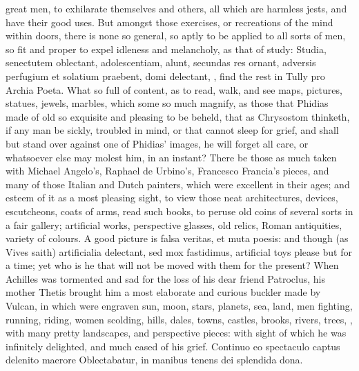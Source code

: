 {great men, to exhilarate themselves and others, all which are harmless
jests, and have their good uses.
But amongst those exercises, or recreations of the mind within doors,
there is none so general, so aptly to be applied to all sorts of men,
so fit and proper to expel idleness and melancholy, as that of study:
Studia, senectutem oblectant, adolescentiam, alunt, secundas res
ornant, adversis perfugium et solatium praebent, domi delectant, \etc{},
find the rest in Tully pro Archia Poeta. What so full of content,
as to read, walk, and see maps, pictures, statues, jewels, marbles,
which some so much magnify, as those that Phidias made of old so
exquisite and pleasing to be beheld, that as Chrysostom thinketh,
if any man be sickly, troubled in mind, or that cannot sleep for grief,
and shall but stand over against one of Phidias' images, he will forget
all care, or whatsoever else may molest him, in an instant? There be
those as much taken with Michael Angelo's, Raphael de Urbino's,
Francesco Francia's pieces, and many of those Italian and Dutch
painters, which were excellent in their ages; and esteem of it as a
most pleasing sight, to view those neat architectures, devices,
escutcheons, coats of arms, read such books, to peruse old coins of
several sorts in a fair gallery; artificial works, perspective glasses,
old relics, Roman antiquities, variety of colours. A good picture is
falsa veritas, et muta poesis: and though (as Vives saith)
artificialia delectant, sed mox fastidimus, artificial toys please but
for a time; yet who is he that will not be moved with them for the
present? When Achilles was tormented and sad for the loss of his dear
friend Patroclus, his mother Thetis brought him a most elaborate and
curious buckler made by Vulcan, in which were engraven sun, moon,
stars, planets, sea, land, men fighting, running, riding, women
scolding, hills, dales, towns, castles, brooks, rivers, trees, \etc{},
with many pretty landscapes, and perspective pieces: with sight of
which he was infinitely delighted, and much eased of his grief.
Continuo eo spectaculo captus delenito maerore
Oblectabatur, in manibus tenens dei splendida dona.

}
